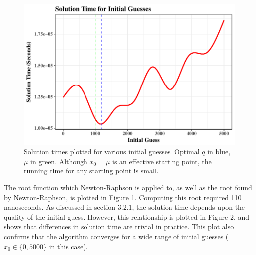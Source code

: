 \documentclass[12pt]{article}
\begin{document}
\begin{figure}
\includegraphics[width=\textwidth]{solution_times_report}
\caption{Solution times plotted for various initial guesses. Optimal $q$ in blue, $\mu$ in green. Although $x_0 = \mu$ is an effective starting point, the running time for any starting point is small.}
\end{figure}
The root function which Newton-Raphson is applied to, as well as the root found by Newton-Raphson, is plotted in Figure 1. Computing this root required 110 nanoseconds. As discussed in section 3.2.1, the solution time depends upon the quality of the initial guess. However, this relationship is plotted in Figure 2, and shows that differences in solution time are trivial in practice. This plot also confirms that the algorithm converges for a wide range of initial guesses ($x_0 \in \{0, 5000\}$ in this case).



\end{document}
